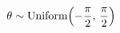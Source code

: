 \documentclass[preview]{standalone}
\begin{document}
\begin{align*}
\theta \sim \text{Uniform}\Bigl(-\frac{\pi}{2},\, \frac{\pi}{2}\Bigr)
\end{align*}
\end{document}
